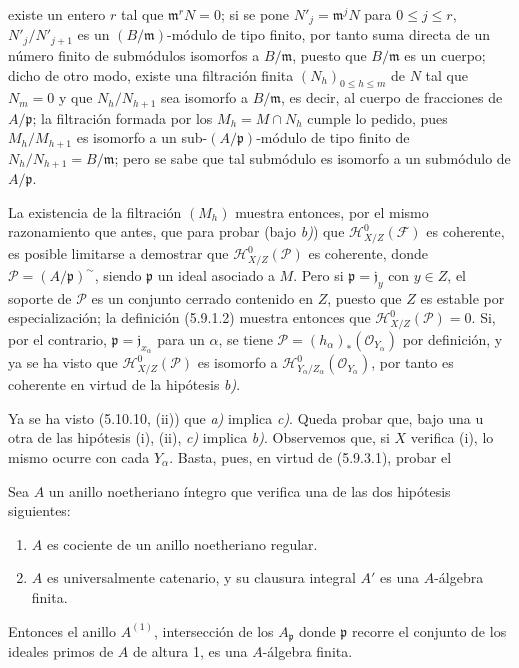 
existe un entero $r$ tal que $\mathfrak m^rN=0$; si se pone
$N'_j=\mathfrak m^jN$ para $0\leq j\leq r$, $N'_j/N'_{j+1}$ es un
$(B/\mathfrak m)$-módulo de tipo finito, por tanto suma directa de un número
finito de submódulos isomorfos a $B/\mathfrak m$, puesto que
$B/\mathfrak m$ es un cuerpo; dicho de otro modo, existe una filtración finita
$(N_h)_{0\leq h\leq m}$ de $N$ tal que $N_m=0$ y que $N_h/N_{h+1}$ sea
isomorfo a $B/\mathfrak m$, es decir, al cuerpo de fracciones de
$A/\mathfrak p$; la filtración formada por los $M_h=M\cap N_h$ cumple lo pedido, pues
$M_h/M_{h+1}$ es isomorfo a un sub-$(A/\mathfrak p)$-módulo de tipo finito de
$N_h/N_{h+1}=B/\mathfrak m$; pero se sabe que tal submódulo es isomorfo a un
submódulo de $A/\mathfrak p$.

La existencia de la filtración $(M_h)$ muestra entonces, por el mismo
razonamiento que antes, que para probar (bajo \emph{b)}) que
$\mathcal H^0_{X/Z}(\mathcal F)$ es coherente, es posible limitarse a demostrar
que $\mathcal H^0_{X/Z}(\mathcal P)$ es coherente, donde
$\mathcal P=(A/\mathfrak p)^\sim$, siendo $\mathfrak p$ un ideal asociado a
$M$. Pero si $\mathfrak p=\mathfrak j_y$ con $y\in Z$, el soporte de
$\mathcal P$ es un conjunto cerrado contenido en $Z$, puesto que $Z$ es
estable por especialización; la definición (5.9.1.2) muestra entonces que
$\mathcal H^0_{X/Z}(\mathcal P)=0$. Si, por el contrario,
$\mathfrak p=\mathfrak j_{x_\alpha}$ para un $\alpha$, se tiene
$\mathcal P=(h_\alpha)_*(\mathcal O_{Y_\alpha})$ por definición, y ya se ha
visto que $\mathcal H^0_{X/Z}(\mathcal P)$ es isomorfo a
$\mathcal H^0_{Y_\alpha/Z_\alpha}(\mathcal O_{Y_\alpha})$,
por tanto es coherente en virtud de la hipótesis \emph{b)}.

Ya se ha visto (5.10.10, (ii)) que \emph{a)} implica \emph{c)}. Queda probar que, bajo una
u otra de las hipótesis (i), (ii), \emph{c)} implica \emph{b)}. Observemos que, si $X$
verifica (i), lo mismo ocurre con cada $Y_\alpha$. Basta, pues, en virtud de
(5.9.3.1), probar el

\begin{corollary}[5.11.2]
Sea $A$ un anillo noetheriano íntegro que verifica una de las dos hipótesis
siguientes:
\begin{enumerate}
\item[\textup{(i)}] $A$ es cociente de un anillo noetheriano regular.
\item[\textup{(ii)}] $A$ es universalmente catenario, y su clausura integral $A'$ es
una $A$-álgebra finita.
\end{enumerate}
Entonces el anillo $A^{(1)}$, intersección de los $A_\mathfrak p$ donde
$\mathfrak p$ recorre el conjunto de los ideales primos de $A$ de altura 1,
es una $A$-álgebra finita.
\end{corollary}

